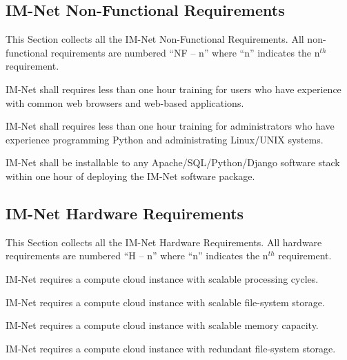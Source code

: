 \documentclass[letterpaper,12pt]{article}
\newcounter{qcounter}						%
\begin{document}
{\textcolor{subsection}{\subsection{IM-Net Non-Functional Requirements}}

This Section collects all the IM-Net Non-Functional Requirements. All non-functional requirements are numbered ``NF -- n'' where ``n'' indicates the n${}^{th}$ requirement.

\begin{list}{NF -- :~}{}

\item  IM-Net shall requires less than one hour training for users who have experience with common web browsers and web-based applications.

\item  IM-Net shall requires less than one hour training for administrators who have experience programming Python and administrating Linux/UNIX systems.

\item  IM-Net shall be installable to any Apache/SQL/Python/Django software stack within one hour of deploying the IM-Net software package.

\end{list}

\textcolor{subsection}{\subsection{IM-Net Hardware Requirements}}

This Section collects all the IM-Net Hardware Requirements. All hardware requirements are numbered ``H -- n'' where ``n'' indicates the n${}^{th}$ requirement.

\begin{list}{H -- :~}{}

\item IM-Net requires a compute cloud instance with scalable processing cycles.

\item IM-Net requires a compute cloud instance with scalable file-system storage.

\item IM-Net requires a compute cloud instance with scalable memory capacity.

\item IM-Net requires a compute cloud instance with redundant file-system storage.


\end{list}}
\end{document}
